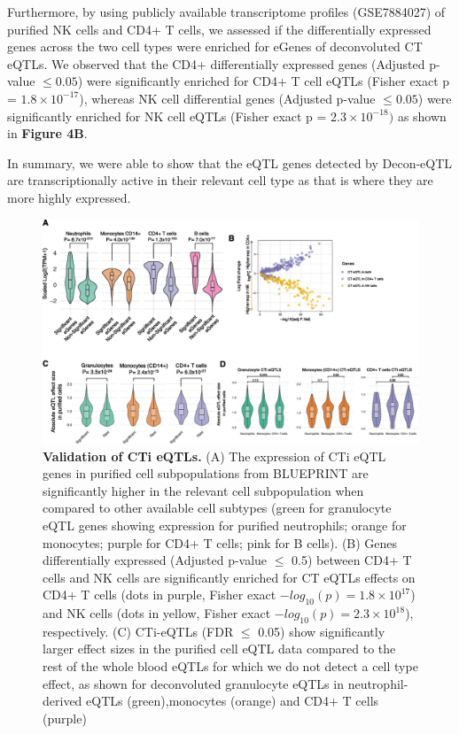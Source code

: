 Furthermore, by using publicly available transcriptome profiles (GSE7884027) of purified NK cells and CD4+ T cells, we assessed if the differentially expressed genes across the two cell types were enriched for eGenes of deconvoluted CT eQTLs. We observed that the CD4+ differentially expressed genes (Adjusted p-value $\leq 0.05$) were significantly enriched for CD4+ T cell eQTLs (Fisher exact p = $1.8 \times 10^{-17}$), whereas NK cell differential genes (Adjusted p-value $\leq 0.05$) were significantly enriched for NK cell eQTLs (Fisher exact p = $2.3 \times 10^{-18})$ as shown in \textbf{Figure 4B}.

In summary, we were able to show that the eQTL genes detected by Decon-eQTL are transcriptionally active in their relevant cell type as that is where they are more highly expressed.

\begin{figure}[H]
	\includegraphics[width=\textwidth]{chapters/chapter4-deconvolution/img/fig4.png}
	\caption{\textbf{Validation of CTi eQTLs.} (A) The expression of CTi eQTL genes in purified cell subpopulations from BLUEPRINT\cite{adamsBLUEPRINTDecodeEpigenetic2012} are significantly higher in the relevant cell subpopulation when compared to other available cell subtypes (green for granulocyte eQTL genes showing expression for purified neutrophils; orange for monocytes; purple for CD4+ T cells; pink for B cells). (B) Genes differentially expressed (Adjusted p-value $\leq$ 0.5) between CD4+ T cells and NK cells are significantly enriched for CT eQTLs effects on CD4+ T cells (dots in purple, Fisher exact $-log_{10}(p) = 1.8 \times 10^{17}$) and NK cells (dots in yellow, Fisher exact $-log_{10}(p) = 2.3 \times 10^{18}$), respectively. (C) CTi-eQTLs (FDR $\leq$ 0.05) show significantly larger effect sizes in the purified cell eQTL data\cite{chenGeneticDriversEpigenetic2016} compared to the rest of the whole blood eQTLs for which we do not detect a cell type effect, as shown for deconvoluted granulocyte eQTLs in neutrophil-derived eQTLs (green),monocytes (orange) and CD4+ T cells (purple)}
\end{figure}



